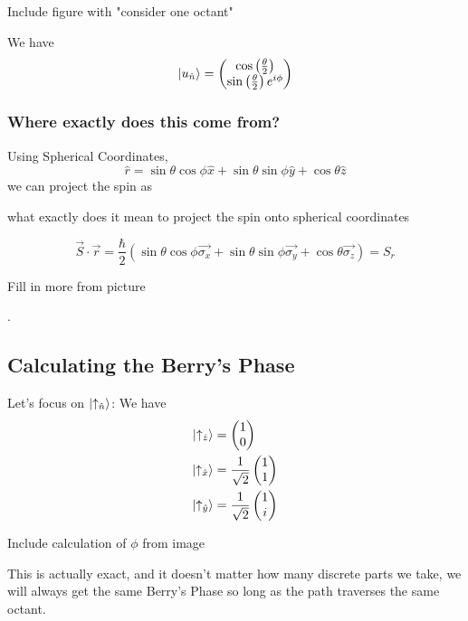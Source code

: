 \documentclass[11pt]{article}
\begin{document}
\begin{center}
  Include figure with "consider one octant"
\end{center} We have $$ \lvert u_{\hat{n}}\rangle = \begin{pmatrix}
  \cos\left(\frac{\theta}{2}\right) \\
  \sin\left(\frac{\theta}{2}\right) e^{i\phi}
\end{pmatrix} $$ 

\subsubsection*{Where exactly does this come from?}
Using Spherical Coordinates, $$ \hat{r} = \sin\theta \cos\phi \hat{x} + \sin\theta \sin\phi \hat{y} + \cos\theta \hat{z} $$ we can project the spin as \begin{note}{what exactly does it mean to project the spin onto spherical coordinates}\end{note} $$ \vec{S} \cdot \vec{r} = \frac{\hbar}{2} \left( \sin\theta \cos\phi \vec{\sigma_x} +  \sin\theta \sin\phi \vec{\sigma_y}  +  \cos\theta \vec{\sigma_z}  \right) = S_r $$\begin{note}
  {Fill in more from picture}
\end{note}.

\vskip 1cm
\subsection{Calculating the Berry's Phase}
Let's focus on $\lvert\uparrow_{\hat{n}}\rangle$: We have 
\begin{align*}
  \lvert\uparrow_{\hat{z}}\rangle &= \begin{pmatrix}
    1 \\ 0
  \end{pmatrix} \\
  \lvert\uparrow_{\hat{x}}\rangle &= \frac{1}{\sqrt{2}} \begin{pmatrix}
    1 \\ 1
  \end{pmatrix} \\
  \lvert\uparrow_{\hat{y}}\rangle &= \frac{1}{\sqrt{2}} \begin{pmatrix}
    1 \\ i
  \end{pmatrix} \\
\end{align*} 

\begin{note}
  {Include calculation of $\phi$ from image}
\end{note} This is actually exact, and it doesn't matter how many discrete parts we take, we will always get the same Berry's Phase so long as the path traverses the same octant.
\end{document}
